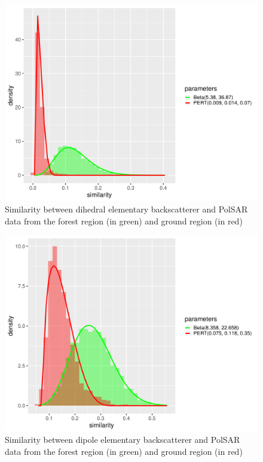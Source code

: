 \documentclass[conference]{IEEEtran}
\begin{document}
\begin{figure}[!ht]
    \centering
    \includegraphics[width = .9\linewidth, height = .7\linewidth]{../../../Figures/paper_19_05/di.pdf}
    \caption{Similarity between dihedral elementary backscatterer and PolSAR data from the forest region (in green) and ground region (in red)}
    \label{fig:di}
\end{figure}

\begin{figure}[!ht]
    \centering
    \includegraphics[width = .9\linewidth, height = .7\linewidth]{../../../Figures/paper_19_05/dip.pdf}
    \caption{Similarity between dipole elementary backscatterer and PolSAR data from the forest region (in green) and ground region (in red)}
    \label{fig:dip}
\end{figure}
\end{document}
